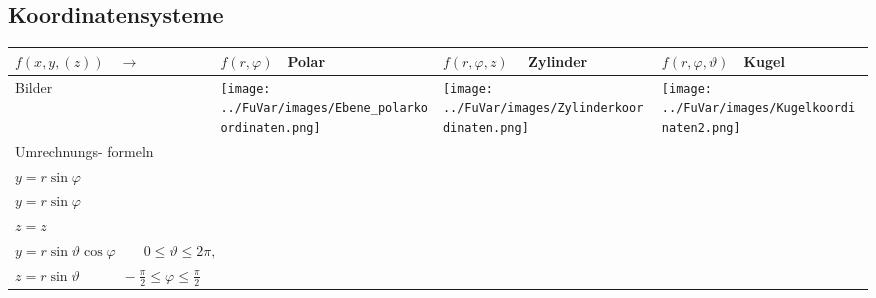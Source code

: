 \subsection{Koordinatensysteme}
\begin{tabular}{|p{2.5cm}||p{3cm}|p{4.2cm}|p{7.5cm}|}
	\hline
	$f(x,y,(z))\quad\rightarrow$ &
	\begin{minipage}{2.4cm}
    	\vspace{0.1cm}
		$f(r,\varphi)\quad$\textbf{Polar} 
    	\vspace{0.1cm}    	
    \end{minipage}& 
	$f(r,\varphi,z)\quad$ \textbf{Zylinder} &
	$f(r,\varphi,\vartheta)\quad$\textbf{Kugel}\\
	\hline
	\hline
	Bilder &
	\begin{minipage}{3cm}
    	\texttt{[image: ../FuVar/images/Ebene\_polarkoordinaten.png]}
    \end{minipage}&
	\begin{minipage}{3cm}
    	\texttt{[image: ../FuVar/images/Zylinderkoordinaten.png]}
    \end{minipage}&
	\begin{minipage}{3cm}
    	\texttt{[image: ../FuVar/images/Kugelkoordinaten2.png]}
    \end{minipage}\\
	\hline
	Umrechnungs- formeln &
	\begin{minipage}{3cm}
    \vspace{0.1cm}
		$x=r\cos\varphi$\\
		$y=r\sin\varphi$    
    \vspace{0.1cm}
    \end{minipage}&	
	\begin{minipage}{4.2cm}
    \vspace{0.1cm}
    	$x=r\cos\varphi$\\
    	$y=r\sin\varphi$\\
    	$z=z$
    \vspace{0.1cm}
    \end{minipage}&	
	\begin{minipage}{7.5cm}
    \vspace{0.1cm}
    	$x=r\cos\vartheta\cos\varphi \quad\quad r \geq 0,$\\
    	$y=r\sin\vartheta\cos\varphi \quad\quad  0\leq\vartheta\leq 2\pi,$\\
    	$z=r\sin\vartheta \quad\quad\quad
    	-\frac{\pi}{2}\leq\varphi\leq\frac{\pi}{2}$
    \vspace{0.1cm}

\end{minipage}
\end{tabular}
